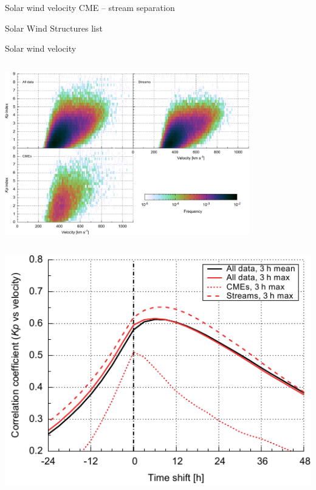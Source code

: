 \begin{frame}[plain,c]{Solar wind velocity}{}
	CME -- stream separation
	
	Solar Wind Structures list
\end{frame}
\begin{frame}[plain,c]{Solar wind velocity}{}
	\begin{columns}[c]
	\column{\textwidth}
		
		\includegraphics[width=0.8\textwidth]{../figures_of_mine/chapter2/Kp_2dhistogram_V_sws_e.pdf}

	\end{columns}
\end{frame}
\begin{frame}[plain,c]{}{}
	\begin{columns}[c]
		


		\includegraphics[width=\textwidth]{../figures_of_mine/chapter2/cc_lag_sws_f.pdf}
	
	\end{columns}
\end{frame}

